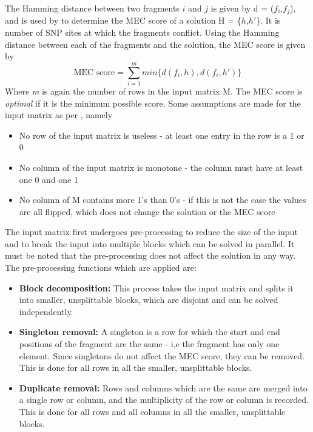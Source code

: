 \documentclass[10pt,twocolumn]{article}
\newcommand{\M}{\textit{m }}
\newcommand{\D}{\textit{d}}
\begin{document}
The Hamming distance between two fragments $i$ and $j$ is given by d = ($f_i$,$f_j$), and is used by \cite{chen:2013} to 
determine the MEC score of a solution H = \{$h$,$h'$\}. It is number of SNP sites at which the fragments 
conflict. Using the Hamming distance between each of the fragments and the solution, the MEC score is given by
\begin{equation*}
\textrm{MEC score} = \sum_{i = 1}^{m}{ min\{\D(f_i, h), \D(f_i, h')\} }
\end{equation*}
Where \M is again the number of rows in the input matrix M. The MEC score is \textit{optimal} if it is the
minimum possible score. Some assumptions are made for the input matrix as per \cite{chen:2013}, namely
\begin{itemize}[noitemsep]
\item{ No row of the input matrix is useless - at least one entry in the row is a 1 or 0 
}
\item{ No column of the input matrix is monotone - the column must have at least one 0 and one 1
}
\item{ No column of M contains more 1's than 0's - if this is not the case the values are all flipped, which
    does not change the solution or the MEC score
}
\end{itemize}
The input matrix first undergoes pre-processing to reduce the size of the input and to break the input into
multiple blocks which can be solved in parallel. It must be noted that the pre-processing does not affect 
the solution in any way. The pre-processing functions which are applied are:
\begin{itemize}[noitemsep]
\item{ \textbf{Block decomposition:} This process takes the input matrix and splits it into smaller,
        unsplittable blocks, which are disjoint and can be solved independently.
}
\item{ \textbf{Singleton removal:} A singleton is a row for which the start and end positions of the fragment
    are the same - i,e the fragment has only one element. Since singletons do not affect the MEC score,
    they can be removed. This is done for all rows in all the smaller, unsplittable blocks.
}
\item{ \textbf{Duplicate removal:} Rows and columns which are the same are merged into a single row or column, 
        and the multiplicity of the row or column is recorded. This is done for all rows and all columns in
        all the smaller, unsplittable blocks.
}
\end{itemize}
\end{document}
